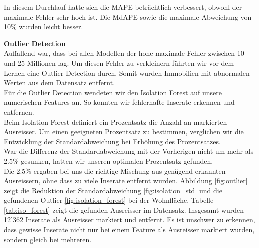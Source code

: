 \begin{table}[ht]
\centering
{}
\caption{Ergebnisse mit Einbezug der Lärmbelastung}
\label{tab:fourth_round}
\end{table}

In diesem Durchlauf hatte sich die MAPE beträchtlich verbessert, obwohl der maximale Fehler sehr hoch ist. Die MdAPE sowie die maximale Abweichung von 10\% wurden leicht besser.

\newpage
\textbf{Outlier Detection}\\
Auffallend war, dass bei allen Modellen der hohe maximale Fehler zwischen 10 und 25 Millionen lag. Um diesen Fehler zu verkleinern führten wir vor dem Lernen eine Outlier Detection durch. Somit wurden Immobilien mit abnormalen Werten aus dem Datensatz entfernt.\\
Für die Outlier Detection wendeten wir den Isolation Forest auf unsere numerischen Features an. So konnten wir fehlerhafte Inserate erkennen und entfernen.\\[2ex]
%
Beim Isolation Forest definiert ein Prozentsatz die Anzahl an markierten Ausreisser.
Um einen geeigneten Prozentsatz zu bestimmen, verglichen wir die Entwicklung der Standardabweichung bei Erhöhung des Prozentsatzes.\\
War die Differenz der Standardabweichung mit der Vorherigen nicht um mehr als 2.5\% gesunken, hatten wir unseren optimalen Prozentsatz gefunden.\\
Die 2.5\% ergaben bei uns die richtige Mischung aus genügend erkannten Ausreissern, ohne dass zu viele Inserate entfernt wurden.
Abbildung \ref{fig:outlier} zeigt die Reduktion der Standardabweichung \ref{fig:isolation_std} und die gefundenen Outlier \ref{fig:isolation_forest} bei der Wohnfläche. Tabelle \ref{tab:iso_forest} zeigt die gefunden Ausreisser im Datensatz. Insgesamt wurden 12'362 Inserate als Ausreisser markiert und entfernt. 
Es ist unschwer zu erkennen, dass gewisse Inserate nicht nur bei einem Feature als Ausreisser markiert wurden, sondern gleich bei mehreren.

